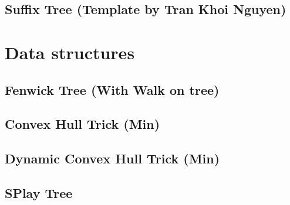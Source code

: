 \subsection{Suffix Tree (Template by Tran Khoi Nguyen)}
\raggedbottom
\hrulefill

\section{Data structures}
\subsection{Fenwick Tree (With Walk on tree)}
\raggedbottom
\hrulefill
\subsection{Convex Hull Trick (Min)}
\raggedbottom
\hrulefill
\subsection{Dynamic Convex Hull Trick (Min)}
\raggedbottom
\hrulefill
\subsection{SPlay Tree}
\raggedbottom
\hrulefill

